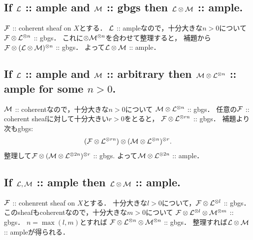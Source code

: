 \documentclass[a4paper]{jsarticle}
\begin{document}
    \subsection{If $\mathcal{L}$ :: ample and $\mathcal{M}$ :: gbgs then $\mathcal{L} \otimes \mathcal{M}$ :: ample.}
        $\mathcal{F}$ :: coherent sheaf on $X$とする．
        $\mathcal{L}$ :: ampleなので，十分大きな$n>0$について
        $\mathcal{F} \otimes \mathcal{L}^{\otimes n}$ :: gbgs．
        これに$\otimes \mathcal{M}^{\otimes n}$を合わせて整理すると，
        補題から$\mathcal{F} \otimes (\mathcal{L} \otimes \mathcal{M})^{\otimes n}$ :: gbgs．
        よって$\mathcal{L} \otimes \mathcal{M}$ :: ample．

    \subsection{If $\mathcal{L}$ :: ample and $\mathcal{M}$ :: arbitrary
        then $\mathcal{M} \otimes \mathcal{L}^{\otimes n}$ :: ample for some $n>0$.}
        $\mathcal{M}$ :: coherentなので，十分大きな$n>0$について
        $\mathcal{M} \otimes \mathcal{L}^{\otimes n}$ :: gbgs．
        任意の$\mathcal{F}$ :: coherent sheafに対して十分大きい$r>0$をとると，
        $\mathcal{F} \otimes \mathcal{L}^{\otimes rn}$ :: gbgs．
        補題より次もgbgs:
        \[ (\mathcal{F} \otimes \mathcal{L}^{\otimes rn}) \otimes (\mathcal{M} \otimes \mathcal{L}^{\otimes n})^{\otimes r}. \]
        整理して$\mathcal{F} \otimes (\mathcal{M} \otimes \mathcal{L}^{\otimes 2n})^{\otimes r}$ :: gbgs.
        よって$\mathcal{M} \otimes \mathcal{L}^{\otimes 2n}$ :: ample．

    \subsection{If $\mathcal{L}, \mathcal{M}$ :: ample then $\mathcal{L} \otimes \mathcal{M}$ :: ample.}
        $\mathcal{F}$ :: cohenrent sheaf on $X$とする．
        十分大きな$l>0$について，$\mathcal{F} \otimes \mathcal{L}^{\otimes l}$ :: gbgs．
        このsheafもcoherentなので，十分大きな$m>0$について
        $\mathcal{F} \otimes \mathcal{L}^{\otimes l} \otimes \mathcal{M}^{\otimes m}$ :: gbgs．
        $n=\max(l,m)$とすれば
        $\mathcal{F} \otimes \mathcal{L}^{\otimes n} \otimes \mathcal{M}^{\otimes n}$ :: gbgs．
        整理すれば$\mathcal{L} \otimes \mathcal{M}$ :: ampleが得られる．
\end{document}
